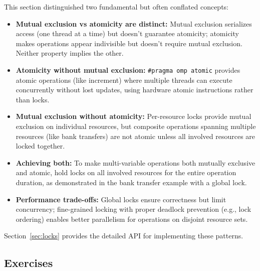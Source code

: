 This section distinguished two fundamental but often conflated concepts:
\begin{itemize}
    \item \textbf{Mutual exclusion vs atomicity are distinct:} Mutual exclusion serializes access (one thread at a time) but doesn't guarantee atomicity; atomicity makes operations appear indivisible but doesn't require mutual exclusion. Neither property implies the other.
    \item \textbf{Atomicity without mutual exclusion:} \texttt{\#pragma omp atomic} provides atomic operations (like increment) where multiple threads can execute concurrently without lost updates, using hardware atomic instructions rather than locks.
    \item \textbf{Mutual exclusion without atomicity:} Per-resource locks provide mutual exclusion on individual resources, but composite operations spanning multiple resources (like bank transfers) are not atomic unless all involved resources are locked together.
    \item \textbf{Achieving both:} To make multi-variable operations both mutually exclusive and atomic, hold locks on all involved resources for the entire operation duration, as demonstrated in the bank transfer example with a global lock.
    \item \textbf{Performance trade-offs:} Global locks ensure correctness but limit concurrency; fine-grained locking with proper deadlock prevention (e.g., lock ordering) enables better parallelism for operations on disjoint resource sets.
\end{itemize}
Section~\ref{sec:locks} provides the detailed API for implementing these patterns.

\subsection{Exercises}

